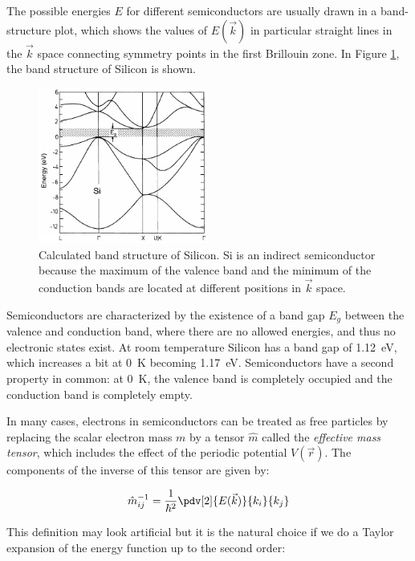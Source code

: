 \documentclass[11pt,a4paper]{article}
\begin{document}
The possible energies $E$ for different semiconductors are usually drawn in a band-structure plot, which shows the values of $E(\vec{k})$ in particular straight lines in the $\vec{k}$ space connecting symmetry points in the first Brillouin zone. In Figure \ref{fig:silicon_band_structure}, the band structure of Silicon is shown.

\begin{figure}[ht]
\centering
\includegraphics[width=0.5\textwidth]{Si_band_structure}
\caption{Calculated band structure of Silicon. Si is an indirect semiconductor because the maximum of the valence band and the minimum of the conduction bands are located at different positions in $\vec{k}$ space.\cite{ibach2009solid}}
\label{fig:silicon_band_structure}
\end{figure}

Semiconductors are characterized by the existence of a band gap $E_g$ between the valence and conduction band, where there are no allowed energies, and thus no electronic states exist. At room temperature Silicon has a band gap of \SI{1.12}{\electronvolt}, which increases a bit at \SI{0}{\kelvin} becoming \SI{1.17}{\electronvolt}. Semiconductors have a second property in common: at \SI{0}{\kelvin}, the valence band is completely occupied and the conduction band is completely empty.

In many cases, electrons in semiconductors can be treated as free particles by replacing the scalar electron mass $m$ by a tensor $\hat{m}$ called the \emph{effective mass tensor}, which includes the effect of the periodic potential $V(\vec{r})$. The components of the inverse of this tensor are given by:

\begin{equation}\label{eq:mass_tensor}
\hat{m}_{ij}^{-1}=\frac{1}{\hbar^2}\pdv[2]{E(\vec{k})}{k_i}{k_j}
\end{equation}

This definition may look artificial but it is the natural choice if we do a Taylor expansion of the energy function up to the second order:
\end{document}
